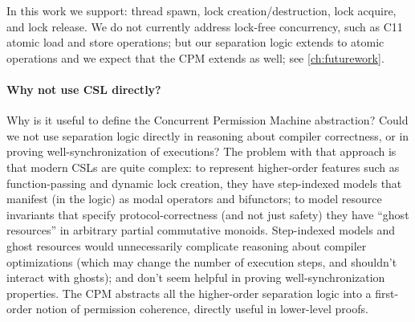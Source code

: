 In this work we support: thread spawn, lock creation/destruction, lock acquire, and
lock release. We do not currently address lock-free concurrency, such as C11
atomic load and store operations; but our
separation logic extends to atomic operations \cite{mailbox}
and we expect that the CPM
extends as well; see \autoref{ch:futurework}.

\paragraph{Why not use CSL directly?}
Why is it useful to define the Concurrent Permission Machine abstraction?
Could we not use separation logic directly in reasoning about
compiler correctness, or in proving well-synchronization of
executions?  The problem with that approach is that modern
CSLs are quite complex: to represent higher-order features such
as function-passing and dynamic lock creation, they have step-indexed
models that manifest (in the logic) as modal operators and bifunctors;
to model resource invariants that specify protocol-correctness
(and not just safety) they have ``ghost resources'' in
arbitrary partial commutative monoids.
Step-indexed models and ghost resources would unnecessarily
complicate reasoning about compiler optimizations (which may
change the number of execution steps, and shouldn't interact with ghosts);
and don't seem helpful in proving well-synchronization properties.
The CPM abstracts all the higher-order separation logic into
a first-order notion of permission coherence, directly useful in
lower-level proofs. 





%
%





